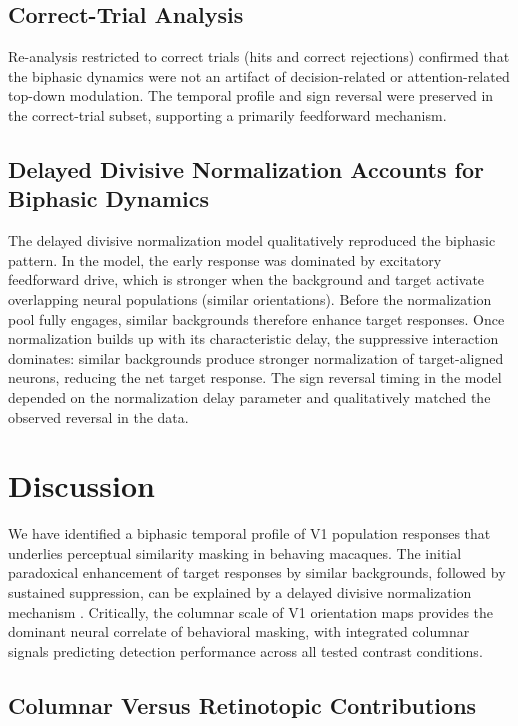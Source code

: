 \documentclass[11pt]{article}
\begin{document}
\subsection{Correct-Trial Analysis}

Re-analysis restricted to correct trials (hits and correct rejections) confirmed that the biphasic dynamics were not an artifact of decision-related or attention-related top-down modulation. The temporal profile and sign reversal were preserved in the correct-trial subset, supporting a primarily feedforward mechanism.

\subsection{Delayed Divisive Normalization Accounts for Biphasic Dynamics}

The delayed divisive normalization model qualitatively reproduced the biphasic pattern. In the model, the early response was dominated by excitatory feedforward drive, which is stronger when the background and target activate overlapping neural populations (similar orientations). Before the normalization pool fully engages, similar backgrounds therefore enhance target responses. Once normalization builds up with its characteristic delay, the suppressive interaction dominates: similar backgrounds produce stronger normalization of target-aligned neurons, reducing the net target response. The sign reversal timing in the model depended on the normalization delay parameter and qualitatively matched the observed reversal in the data.

\section{Discussion}

We have identified a biphasic temporal profile of V1 population responses that underlies perceptual similarity masking in behaving macaques. The initial paradoxical enhancement of target responses by similar backgrounds, followed by sustained suppression, can be explained by a delayed divisive normalization mechanism \citep{carandini2012}. Critically, the columnar scale of V1 orientation maps provides the dominant neural correlate of behavioral masking, with integrated columnar signals predicting detection performance across all tested contrast conditions.

\subsection{Columnar Versus Retinotopic Contributions}
\end{document}
